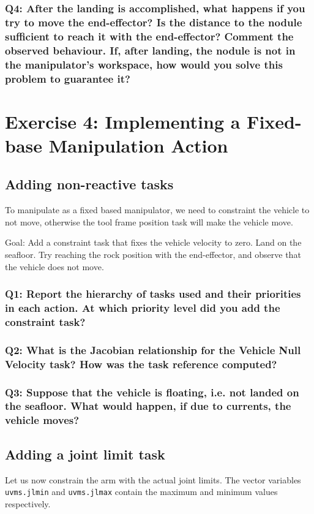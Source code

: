 \documentclass{article}
\begin{document}
\subsubsection{Q4: After the landing is accomplished, what happens if you try to move the end-effector? Is the distance to the nodule sufficient to reach it with the end-effector? Comment the observed behaviour. If, after landing, the nodule is not in the manipulator's workspace, how would you solve this problem to guarantee it?}


\clearpage
\section{Exercise 4: Implementing a Fixed-base Manipulation Action}
\subsection{Adding non-reactive tasks}
To manipulate as a fixed based manipulator, we need to constraint the vehicle to not move, otherwise the tool frame position task will make the vehicle move.

Goal: Add a constraint task that fixes the vehicle velocity to zero. Land on the seafloor. Try reaching the rock position with the end-effector, and observe that the vehicle does not move.

\subsubsection{Q1: Report the hierarchy of tasks used and their priorities in each action. At which priority level did you add the constraint task?}

\subsubsection{Q2: What is the Jacobian relationship for the Vehicle Null Velocity task? How was the task reference computed?}

\subsubsection{Q3: Suppose that the vehicle is floating, i.e. not landed on the seafloor. What would happen, if due to currents, the vehicle moves?}


\subsection{Adding a joint limit task}
Let us now constrain the arm with the actual joint limits. The vector variables \texttt{uvms.jlmin} and \texttt{uvms.jlmax} contain the maximum and minimum values respectively.
\end{document}
